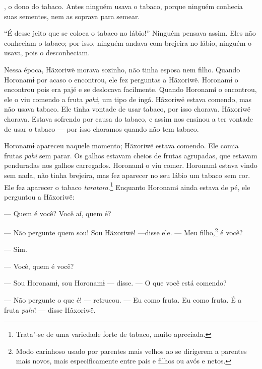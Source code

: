  

 

, o dono do tabaco. Antes ninguém usava o
tabaco, porque ninguém conhecia suas sementes, nem as soprava para
semear. 

 ``É desse jeito que se coloca o tabaco no lábio!'' Ninguém pensava
assim. Eles não conheciam o tabaco; por isso, ninguém andava com
brejeira no lábio, ninguém o usava, pois o desconheciam. 

Nessa época, Hãxoriwë morava sozinho, não tinha esposa nem
filho. Quando Horonamɨ por acaso o encontrou, ele fez
perguntas a Hãxoriwë. Horonamɨ o encontrou pois era pajé e se deslocava
facilmente. Quando Horonamɨ o encontrou, ele o viu comendo a
fruta \emph{pahi}, um tipo de ingá. Hãxoriwë estava comendo, mas não
usava tabaco. Ele tinha vontade de usar tabaco, por isso chorava.
Hãxoriwë chorava. Estava sofrendo por causa do tabaco, e assim nos
ensinou a ter vontade de usar o tabaco --- por isso choramos quando não
tem tabaco. 

Horonamɨ apareceu naquele momento; Hãxoriwë estava comendo. Ele comia
frutas \emph{pahi} sem parar. Os galhos estavam cheios de frutas
agrupadas, que estavam penduradas nos galhos carregados. Horonamɨ o viu
comer. Horonamɨ estava vindo sem nada, não tinha brejeira, mas fez
aparecer no seu lábio um tabaco sem cor. Ele fez aparecer o
tabaco \emph{taratara}.\footnote{  Trata"-se de uma variedade forte de tabaco, muito apreciada.}  Enquanto Horonamɨ ainda estava
de pé, ele perguntou a Hãxoriwë: 

--- Quem é você? Você aí, quem é? 

--- Não pergunte quem sou! Sou Hãxoriwë! ---disse ele. --- Meu
filho,\footnote{  Modo carinhoso usado por parentes mais velhos ao se dirigerem a
parentes mais novos, mais especificamente entre pais e filhos ou avós e
netos.}  é você? 

--- Sim.

--- Você, quem é você?

--- Sou Horonamɨ, sou Horonamɨ --- disse. --- O que você está comendo? 

--- Não pergunte o que é! --- retrucou. --- Eu como fruta. Eu como
fruta. É a fruta \emph{pahi}! --- disse Hãxoriwë. 

